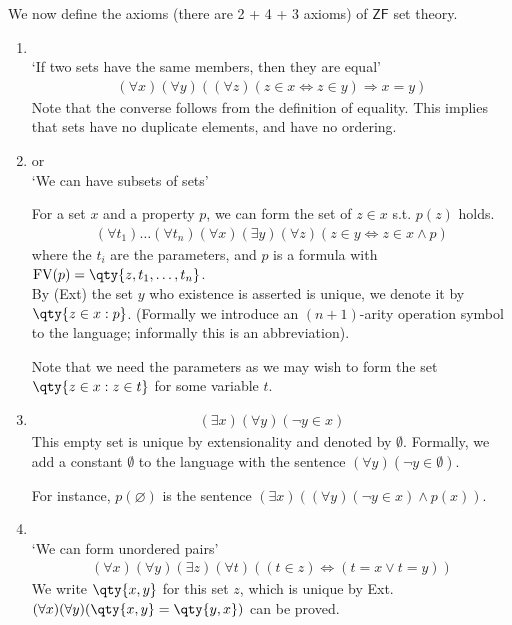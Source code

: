We now define the axioms (there are 2 + 4 + 3 axioms) of $\mathsf{ZF}$ set theory.
\begin{enumerate}
    \item {} \\
    `If two sets have the same members, then they are equal'
    \begin{align*}
        (\forall x)(\forall y)((\forall z)(z \in x \Leftrightarrow z \in y) \Rightarrow x = y)
    \end{align*}
    Note that the converse follows from the definition of equality.
    This implies that sets have no duplicate elements, and have no ordering.

    \item {} or  \\
    `We can have subsets of sets'

    For a set $x$ and a property $p$, we can form the set of $z \in x$ s.t. $p(z)$ holds.
    \begin{align*}
        (\forall t_1)\dots(\forall t_n)(\forall x)(\exists y)(\forall z)(z \in y \Leftrightarrow z \in x \wedge p)
    \end{align*}
    where the $t_i$ are the parameters, and $p$ is a formula with $\FV(p) = \qty{z, t_1, \dots, t_n}$. \\
    By (Ext) the set $y$ who existence is asserted is unique, we denote it by $\qty{z \in x : p}$.
    (Formally we introduce an $(n + 1)$-arity operation symbol to the language; informally this is an abbreviation).

    \begin{example}
        Note that we need the parameters as we may wish to form the set $\qty{z \in x : z \in t}$ for some variable $t$.
    \end{example}
    \item {}
    \begin{align*}
        (\exists x)(\forall y)(\neg y \in x)
    \end{align*}
    This empty set is unique by extensionality and denoted by $\emptyset$.
    Formally, we add a constant $\emptyset$ to the language with the sentence $(\forall y)(\neg y \in \emptyset)$.

    \begin{example}
        For instance, $p(\varnothing)$ is the sentence $(\exists x)((\forall y)(\neg y \in x) \wedge p(x))$.
    \end{example}
    \item {} \\
    `We can form unordered pairs'
    \begin{align*}
        (\forall x)(\forall y)(\exists z)(\forall t)((t \in z) \Leftrightarrow (t = x \vee t = y))
    \end{align*}
    We write $\qty{x, y}$ for this set $z$, which is unique by Ext.
    $(\forall x)(\forall y) (\qty{x, y} = \qty{y, x})$ can be proved.


\end{enumerate}

